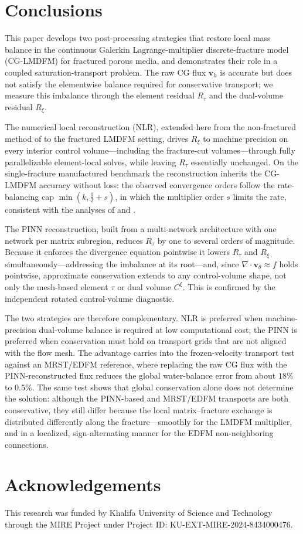 \documentclass[a4paper,fleqn]{cas-sc}
\newcommand{\vflux}{\mathbf{v}}
\begin{document}
\section{Conclusions}
\label{sec:conclusions}

This paper develops two post-processing strategies that restore local mass
balance in the continuous Galerkin Lagrange-multiplier discrete-fracture model
(CG-LMDFM) for fractured porous media, and demonstrates their role in a coupled
saturation-transport problem. The raw CG flux \(\vflux_h\) is accurate but does
not satisfy the elementwise balance required for conservative transport; we
measure this imbalance through the element residual \(R_\tau\) and the
dual-volume residual \(R_\xi\).

The numerical local reconstruction (NLR), extended here from the non-fractured
method of \citet{DENG2019166} to the fractured LMDFM setting, drives \(R_\xi\) to
machine precision on every interior control volume---including the fracture-cut
volumes---through fully parallelizable element-local solves, while leaving
\(R_\tau\) essentially unchanged. On the single-fracture manufactured benchmark
the reconstruction inherits the CG-LMDFM accuracy without loss: the observed
convergence orders follow the rate-balancing cap \(\min(k,\tfrac12+s)\), in which
the multiplier order \(s\) limits the rate, consistent with the analyses of
\citet{DENG2019166} and \citet{Koeppel2019}.

The PINN reconstruction, built from a multi-network architecture with one network
per matrix subregion, reduces \(R_\tau\) by one to several orders of magnitude.
Because it enforces the divergence equation pointwise it lowers \(R_\tau\) and
\(R_\xi\) simultaneously---addressing the imbalance at its root---and, since
\(\nabla\cdot\vflux_\theta\approx f\) holds pointwise, approximate conservation
extends to any control-volume shape, not only the mesh-based element \(\tau\) or
dual volume \(C^\xi\). This is confirmed by the independent rotated
control-volume diagnostic.

The two strategies are therefore complementary. NLR is preferred when
machine-precision dual-volume balance is required at low computational cost; the
PINN is preferred when conservation must hold on transport grids that are not
aligned with the flow mesh. The advantage carries into the frozen-velocity
transport test against an MRST/EDFM reference, where replacing the raw CG flux
with the PINN-reconstructed flux reduces the global water-balance error from
about \(18\%\) to \(0.5\%\). The same test shows that global conservation alone
does not determine the solution: although the PINN-based and MRST/EDFM transports
are both conservative, they still differ because the local matrix--fracture
exchange is distributed differently along the fracture---smoothly for the LMDFM
multiplier, and in a localized, sign-alternating manner for the EDFM
non-neighboring connections.

\section*{Acknowledgements}

This research was funded by Khalifa University of Science and Technology through
the MIRE Project under Project ID: KU-EXT-MIRE-2024-8434000476.



\end{document}
